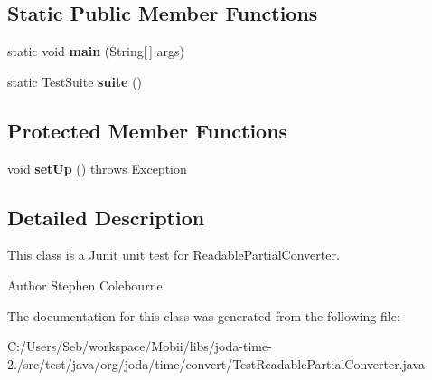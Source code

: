 \subsection*{Static Public Member Functions}
\begin{DoxyCompactItemize}
\item 
\hypertarget{classorg_1_1joda_1_1time_1_1convert_1_1_test_readable_partial_converter_a5d5a8b328349b67b7f720d9c03d4b87e}{static void {\bfseries main} (String\mbox{[}$\,$\mbox{]} args)}\label{classorg_1_1joda_1_1time_1_1convert_1_1_test_readable_partial_converter_a5d5a8b328349b67b7f720d9c03d4b87e}

\item 
\hypertarget{classorg_1_1joda_1_1time_1_1convert_1_1_test_readable_partial_converter_ad47654bb9b8271f843b64285f9c7c936}{static Test\-Suite {\bfseries suite} ()}\label{classorg_1_1joda_1_1time_1_1convert_1_1_test_readable_partial_converter_ad47654bb9b8271f843b64285f9c7c936}

\end{DoxyCompactItemize}
\subsection*{Protected Member Functions}
\begin{DoxyCompactItemize}
\item 
\hypertarget{classorg_1_1joda_1_1time_1_1convert_1_1_test_readable_partial_converter_a8720a9f18816310d0bc878003504b653}{void {\bfseries set\-Up} ()  throws Exception }\label{classorg_1_1joda_1_1time_1_1convert_1_1_test_readable_partial_converter_a8720a9f18816310d0bc878003504b653}

\end{DoxyCompactItemize}


\subsection{Detailed Description}
This class is a Junit unit test for Readable\-Partial\-Converter.

\begin{DoxyAuthor}{Author}
Stephen Colebourne 
\end{DoxyAuthor}


The documentation for this class was generated from the following file\-:\begin{DoxyCompactItemize}
\item 
C\-:/\-Users/\-Seb/workspace/\-Mobii/libs/joda-\/time-\/2./src/test/java/org/joda/time/convert/Test\-Readable\-Partial\-Converter.\-java\end{DoxyCompactItemize}
